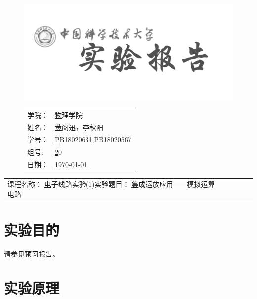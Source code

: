 \documentclass[a4paper,11pt,UTF8]{ctexart}
\newcommand{\major}{物理学院}
\newcommand{\name}{黄阅迅，李秋阳}
\newcommand{\stuid}{PB18020631,PB18020567}
\newcommand{\group}{20}
\newcommand{\newdate}{\today}
\newcommand{\course}{电子线路实验(1)}
\newcommand{\newtitle}{集成运放应用——模拟运算电路}
\begin{document}
\thispagestyle{empty}
\begin{figure}[h]
  \begin{minipage}{0.6\linewidth}
    \centerline{\includegraphics[width=\linewidth]{logo.png}}
  \end{minipage}
  \hfill
  \begin{minipage}{.4\linewidth}
    \raggedleft
    \begin{tabular*}{.8\linewidth}{ll}
      学院： & \underline\major   \\
      姓名： & \underline\name    \\
      学号： & \underline\stuid   \\
      组号:  & \underline\group   \\
      日期： & \underline\newdate \\
    \end{tabular*}
  \end{minipage}
\end{figure}

\begin{table}[!htbp]
  \centering
  \begin{tabular*}{\linewidth}{llllll}
    课程名称：  \underline\course   \qquad\qquad 实验题目：  \underline\newtitle  
  \end{tabular*}
\end{table}


\section{实验目的}

请参见预习报告。

\section{实验原理}
\end{document}
